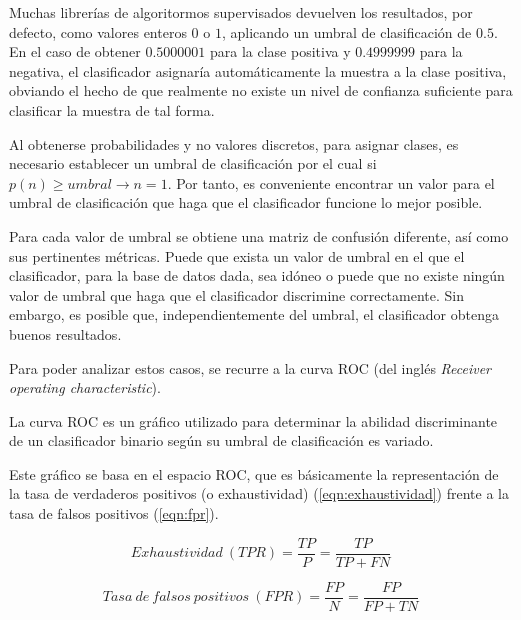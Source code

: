Muchas librerías de algoritormos supervisados devuelven los resultados, por defecto, como valores enteros $0$ o $1$, aplicando un umbral de clasificación de $0.5$. En el caso de obtener $0.5000001$ para la clase positiva y $0.4999999$ para la negativa, el clasificador asignaría automáticamente la muestra a la clase positiva, obviando el hecho de que realmente no existe un nivel de confianza suficiente para clasificar la muestra de tal forma.

Al obtenerse probabilidades y no valores discretos, para asignar clases, es necesario establecer un umbral de clasificación por el cual si $p(n) \geq umbral \rightarrow n = 1$. Por tanto, es conveniente encontrar un valor para el umbral de clasificación que haga que el clasificador funcione lo mejor posible.

Para cada valor de umbral se obtiene una matriz de confusión diferente, así como sus pertinentes métricas. Puede que exista un valor de umbral en el que el clasificador, para la base de datos dada, sea idóneo o puede que no existe ningún valor de umbral que haga que el clasificador discrimine correctamente. Sin embargo, es posible que, independientemente del umbral, el clasificador obtenga buenos resultados.

Para poder analizar estos casos, se recurre a la curva ROC (del inglés \textit{Receiver operating characteristic}).

La curva ROC es un gráfico utilizado para determinar la abilidad discriminante de un clasificador binario según su umbral de clasificación es variado.

Este gráfico se basa en el espacio ROC, que es básicamente la representación de la tasa de verdaderos positivos (o exhaustividad) (\ref{eqn:exhaustividad}) frente a la tasa de falsos positivos (\ref{eqn:fpr}).


\begin{equation}
	Exhaustividad\:(TPR) = \dfrac{TP}{P} = \dfrac{TP}{TP+FN}
	\label{eqn:exhaustividad}
\end{equation}

\begin{equation}
	Tasa\: de\: falsos\: positivos\:(FPR) = \dfrac{FP}{N} = \dfrac{FP}{FP+TN}
	\label{eqn:fpr}
\end{equation}

